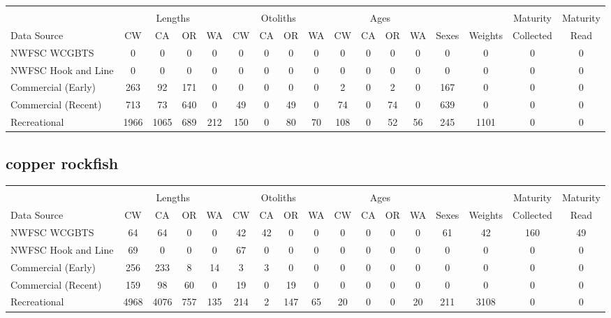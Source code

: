 \documentclass[12pt,]{article}
\begin{document}
\begin{table}[ht]
\centering
\begingroup\fontsize{10pt}{10pt}\selectfont
\begin{tabular}{|l|cccc|cccc|cccc|c|c|c|c|}
  \hline
 &  &  &  &  &  &  &  &  &  &  &  &  &  &  &  &  \\ 
   & \multicolumn{4}{c}{Lengths} &  \multicolumn{4}{c}{Otoliths} & \multicolumn{4}{c}{Ages} &  & & Maturity & Maturity\\
 Data Source & CW & CA & OR & WA & CW & CA & OR & WA & CW & CA & OR & WA & Sexes & Weights & Collected & Read\\
 \hline
NWFSC WCGBTS & 0 & 0 & 0 & 0 & 0 & 0 & 0 & 0 & 0 & 0 & 0 & 0 & 0 & 0 & 0 & 0 \\ 
  NWFSC Hook and Line & 0 & 0 & 0 & 0 & 0 & 0 & 0 & 0 & 0 & 0 & 0 & 0 & 0 & 0 & 0 & 0 \\ 
  Commercial (Early) & 263 & 92 & 171 & 0 & 0 & 0 & 0 & 0 & 2 & 0 & 2 & 0 & 167 & 0 & 0 & 0 \\ 
  Commercial (Recent) & 713 & 73 & 640 & 0 & 49 & 0 & 49 & 0 & 74 & 0 & 74 & 0 & 639 & 0 & 0 & 0 \\ 
  Recreational & 1966 & 1065 & 689 & 212 & 150 & 0 & 80 & 70 & 108 & 0 & 52 & 56 & 245 & 1101 & 0 & 0 \\ 
   \hline
\end{tabular}
\endgroup
\end{table}

\FloatBarrier  

\newpage  

\subsection{copper rockfish}\label{copper-rockfish}

\begin{table}[ht]
\centering
\begingroup\fontsize{10pt}{10pt}\selectfont
\begin{tabular}{|l|cccc|cccc|cccc|c|c|c|c|}
  \hline
 &  &  &  &  &  &  &  &  &  &  &  &  &  &  &  &  \\ 
   & \multicolumn{4}{c}{Lengths} &  \multicolumn{4}{c}{Otoliths} & \multicolumn{4}{c}{Ages} &  & & Maturity & Maturity\\
 Data Source & CW & CA & OR & WA & CW & CA & OR & WA & CW & CA & OR & WA & Sexes & Weights & Collected & Read\\
 \hline
NWFSC WCGBTS & 64 & 64 & 0 & 0 & 42 & 42 & 0 & 0 & 0 & 0 & 0 & 0 & 61 & 42 & 160 & 49 \\ 
  NWFSC Hook and Line & 69 & 0 & 0 & 0 & 67 & 0 & 0 & 0 & 0 & 0 & 0 & 0 & 0 & 0 & 0 & 0 \\ 
  Commercial (Early) & 256 & 233 & 8 & 14 & 3 & 3 & 0 & 0 & 0 & 0 & 0 & 0 & 0 & 0 & 0 & 0 \\ 
  Commercial (Recent) & 159 & 98 & 60 & 0 & 19 & 0 & 19 & 0 & 0 & 0 & 0 & 0 & 0 & 0 & 0 & 0 \\ 
  Recreational & 4968 & 4076 & 757 & 135 & 214 & 2 & 147 & 65 & 20 & 0 & 0 & 20 & 211 & 3108 & 0 & 0 \\ 
   \hline
\end{tabular}
\endgroup
\end{table}
\end{document}
